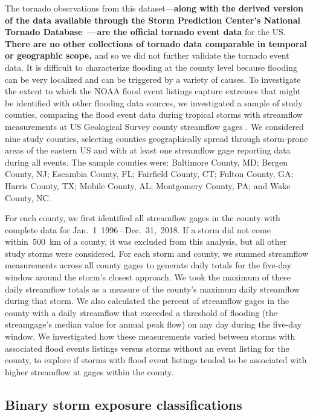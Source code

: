 The tornado observations from this dataset---\textbf{along with the derived
version of the data available through the Storm Prediction Center's National
Tornado Database~\parencite{center2020storm}---are the official tornado event
data} for the \ac{US}. \textbf{There are no other collections of tornado data
comparable in temporal or geographic scope,} and so we did not further validate
the tornado event data. It is difficult to characterize flooding at the county
level because flooding can be very localized and can be triggered by a variety
of causes. To investigate the extent to which the NOAA flood event listings
capture extremes that might be identified with other flooding data sources, we
investigated a sample of study counties, comparing the flood event data during
tropical storms with streamflow measurements at \ac{US} Geological Survey
county streamflow gages \parencite{usgsgages, countyfloods, dataRetrieval}.  We
considered nine study counties, selecting counties geographically spread
through storm-prone areas of the eastern \ac{US} and with at least one
streamflow gage reporting data during all events. The sample counties were:
Baltimore County, MD; Bergen County, NJ; Escambia County, FL; Fairfield County,
CT; Fulton County, GA; Harris County, TX; Mobile County, AL; Montgomery County,
PA; and Wake County, NC. 

For each county, we first identified all streamflow gages in the county with
complete data for Jan.~1~1996\,--\,Dec.~31,~2018. If a storm did not come
within~500~\si{\kilo\metre} of a county, it was excluded from this analysis,
but all other study storms were considered.  For each storm and county, we
summed streamflow measurements across all county gages to generate daily totals
for the five-day window around the storm's closest approach. We took the
maximum of these daily streamflow totals as a measure of the county's maximum
daily streamflow during that storm. We also calculated the percent of
streamflow gages in the county with a daily streamflow that exceeded a
threshold of flooding (the streamgage's median value for annual peak flow) on
any day during the five-day window. We investigated how these measurements
varied between storms with associated flood events listings versus storms
without an event listing for the county, to explore if storms with flood event
listings tended to be associated with higher streamflow at gages within the
county.

\subsection*{Binary storm exposure classifications}

